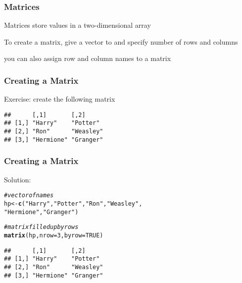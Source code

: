 \documentclass[12pt]{beamer}\usepackage[]{graphicx}\usepackage[]{color}
\makeatletter
\newcommand{\hlnum}[1]{\textcolor[rgb]{0.686,0.059,0.569}{#1}}%
\newcommand{\hlstr}[1]{\textcolor[rgb]{0.192,0.494,0.8}{#1}}%
\newcommand{\hlcom}[1]{\textcolor[rgb]{0.678,0.584,0.686}{\textit{#1}}}%
\newcommand{\hlstd}[1]{\textcolor[rgb]{0.345,0.345,0.345}{#1}}%
\newcommand{\hlkwb}[1]{\textcolor[rgb]{0.69,0.353,0.396}{#1}}%
\newcommand{\hlkwc}[1]{\textcolor[rgb]{0.333,0.667,0.333}{#1}}%
\newcommand{\hlkwd}[1]{\textcolor[rgb]{0.737,0.353,0.396}{\textbf{#1}}}%
\newenvironment{kframe}{%
 \def\at@end@of@kframe{}%
 \ifinner\ifhmode%
  \def\at@end@of@kframe{\end{minipage}}%
  \begin{minipage}{\columnwidth}%
 \fi\fi%
 \def\FrameCommand##1{\hskip\@totalleftmargin \hskip-\fboxsep
 \colorbox{shadecolor}{##1}\hskip-\fboxsep
     \hskip-\linewidth \hskip-\@totalleftmargin \hskip\columnwidth}%
 \MakeFramed {\advance\hsize-\width
   \@totalleftmargin\z@ \linewidth\hsize
   \@setminipage}}%
 {\par\unskip\endMakeFramed%
 \at@end@of@kframe}
\newenvironment{knitrout}{}{} %
\makeatother
\begin{document}

\begin{frame}[fragile]
\frametitle{Matrices}

\bi
  \item Matrices store values in a two-dimensional array
  \item To create a matrix, give a vector to  and specify number of rows and columns
  \item you can also assign row and column names to a matrix
\ei

\end{frame}


\begin{frame}[fragile]
\frametitle{Creating a Matrix}

Exercise: create the following matrix
\begin{knitrout}\footnotesize
{}\color{fgcolor}\begin{kframe}
\begin{verbatim}
##      [,1]       [,2]     
## [1,] "Harry"    "Potter" 
## [2,] "Ron"      "Weasley"
## [3,] "Hermione" "Granger"
\end{verbatim}
\end{kframe}
\end{knitrout}

\end{frame}


\begin{frame}[fragile]
\frametitle{Creating a Matrix}

Solution:
\begin{knitrout}\footnotesize
{}\color{fgcolor}\begin{kframe}
\begin{alltt}
\hlcom{# vector of names}
\hlstd{hp} \hlkwb{<-} \hlkwd{c}\hlstd{(}\hlstr{"Harry"}\hlstd{,} \hlstr{"Potter"}\hlstd{,} \hlstr{"Ron"}\hlstd{,} \hlstr{"Weasley"}\hlstd{,}
        \hlstr{"Hermione"}\hlstd{,} \hlstr{"Granger"}\hlstd{)}

\hlcom{# matrix filled up by rows}
\hlkwd{matrix}\hlstd{(hp,} \hlkwc{nrow} \hlstd{=} \hlnum{3}\hlstd{,} \hlkwc{byrow} \hlstd{=} \hlnum{TRUE}\hlstd{)}
\end{alltt}
\begin{verbatim}
##      [,1]       [,2]     
## [1,] "Harry"    "Potter" 
## [2,] "Ron"      "Weasley"
## [3,] "Hermione" "Granger"
\end{verbatim}
\end{kframe}
\end{knitrout}

\end{frame}
\end{document}
